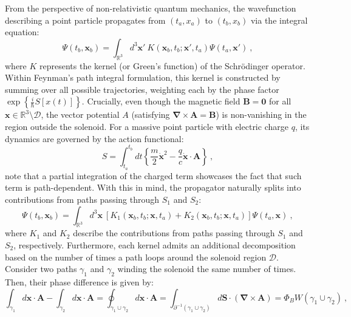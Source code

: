 \documentclass[a4paper,11pt]{article}
\begin{document}
From the perspective of non-relativistic quantum mechanics, the wavefunction describing a point particle propagates from $(t_a, x_a)$ to $(t_b, x_b)$ via the integral equation:
\begin{equation}
    \Psi(t_b,\boldsymbol x_b) = \int_{\mathbb{R}^3} d^3 \boldsymbol x'\ K( \boldsymbol x_b, t_b;  \boldsymbol x',t_a) \Psi(t_a,\boldsymbol x')\ ,
\end{equation}
where $K$ represents the kernel (or Green's function) of the Schrödinger operator. Within Feynman's path integral formulation, this kernel is constructed by summing over all possible trajectories, weighting each by the phase factor $\exp\left\{\frac{i}{\hbar} S[x(t)]\right\}$. Crucially, even though the magnetic field $\boldsymbol B=\boldsymbol 0$ for all $\boldsymbol x \in \mathbb{R}^3 \setminus \mathcal{D}$, the vector potential $A$ (satisfying $\boldsymbol \nabla \times \boldsymbol A = \boldsymbol B$) is non-vanishing in the region outside the solenoid. For a massive point particle with electric charge $q$, its dynamics are governed by the action functional:
\begin{equation}
    S = \int_{t_a}^{t_b} dt \left\{ \frac{m}{2}\dot{\boldsymbol x}^2 - \frac{q}{c}\dot{\boldsymbol{x}}\cdot\boldsymbol{A} \right\}\ ,
\end{equation}
note that a partial integration of the charged term showcases the fact that such term is path-dependent. With this in mind, the propagator naturally splits into contributions from paths passing through $S_1$ and $S_2$:
\begin{equation}
    \Psi(t_b, \boldsymbol x_b) =  \int_{\mathbb{R}^3} d^3  \boldsymbol x\ \left[K_1( \boldsymbol x_b, t_b;  \boldsymbol x, t_a) +  K_2( \boldsymbol x_b, t_b; \boldsymbol x, t_a) \right] \Psi(t_a, \boldsymbol x)\ ,
\end{equation}
where $K_1$ and $K_2$ describe the contributions from paths passing through $S_1$ and $S_2$, respectively. Furthermore, each kernel admits an additional decomposition based on the number of times a path loops around the solenoid region $\mathcal{D}$. Consider two paths $\gamma_1$ and $\gamma_2$ winding the solenoid the same number of times. Then, their phase difference is given by:
\begin{equation}
    \int_{\gamma_1} d\boldsymbol{x}\cdot\boldsymbol{A} - \int_{\gamma_2} d\boldsymbol{x}\cdot\boldsymbol{A} = \oint_{\gamma_1 \cup \gamma_2} d\boldsymbol{x}\cdot\boldsymbol{A} = \int_{\partial^{-1}(\gamma_1 \cup \gamma_2)} d\boldsymbol{S}\cdot(\boldsymbol\nabla \times \boldsymbol{A}) = \Phi_B W(\gamma_1 \cup \gamma_2)\ ,
\end{equation}
\end{document}
